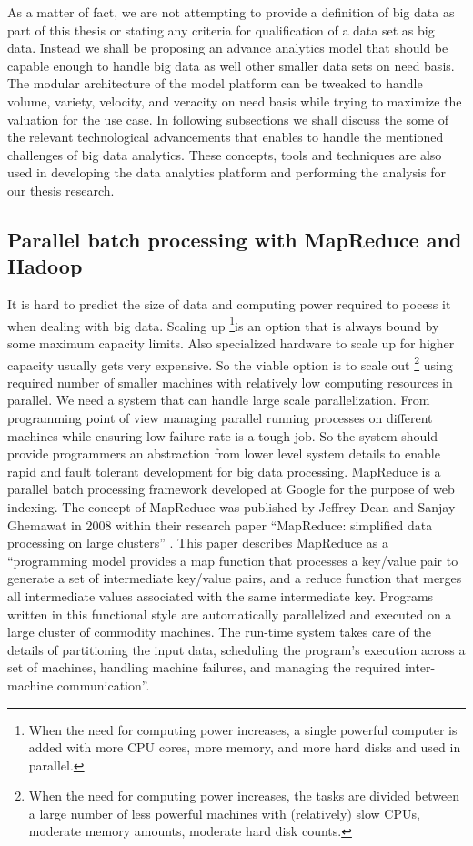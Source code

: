 As a matter of fact, we are not attempting to provide a definition of big data as part of this thesis or stating any criteria for qualification of a data set as big data. Instead we shall be proposing an advance analytics model that should be capable enough to handle big data as well other smaller data sets on need basis. The modular architecture of the model platform can be tweaked to handle volume, variety, velocity, and veracity on need basis while trying to maximize the valuation for the use case. In following subsections we shall discuss the some of the relevant technological advancements that enables to handle the mentioned challenges of big data analytics. These concepts, tools and techniques are also used in developing the data analytics platform and performing the analysis for our thesis research.

\subsection{Parallel batch processing with MapReduce and Hadoop} 
It is hard to predict the size of data and computing power required to pocess it when dealing with big data. Scaling up \footnote{When the need for computing power increases, a single powerful computer is added with more CPU cores, more memory, and more hard disks and used in parallel.}is an option that is always bound by some maximum capacity limits. Also specialized hardware to scale up for higher capacity usually gets very expensive. So the viable option is to scale out \footnote{When the need for computing power increases, the tasks are divided between a large number of less powerful machines with (relatively) slow CPUs, moderate memory amounts, moderate hard disk counts.} using required number of smaller machines with relatively low computing resources in parallel. We need a system that can handle large scale parallelization. From programming point of view managing parallel running processes on different machines while ensuring low failure rate is a tough job. So the system should provide programmers an abstraction from lower level system details to enable rapid and fault tolerant development for big data processing.  MapReduce is a parallel batch processing framework developed at Google for the purpose of web indexing. The concept of MapReduce was published by Jeffrey Dean and Sanjay Ghemawat in 2008 within their research paper ``MapReduce: simplified data processing on large clusters''  \cite{dean2008mapreduce}. This paper describes MapReduce as  a ``programming model provides a map function that processes a key/value pair to generate a set of intermediate key/value pairs, and a reduce function that merges all intermediate values associated with the same intermediate key. Programs written in this functional style are automatically parallelized and executed on a large cluster of commodity machines. The run-time system takes care of the details of partitioning the input data, scheduling the program's execution across a set of machines, handling machine failures, and managing the required inter-machine communication''.

